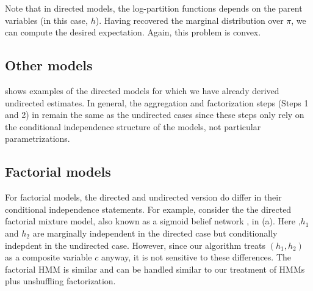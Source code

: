 Note that in directed models, the log-partition functions depends on the parent variables (in this case, $h$).
Having recovered the marginal distribution over $\pi$, we can compute the desired expectation.
Again, this problem is convex.



\subsection{Other models}

 shows examples of the directed models
for which we have already derived undirected estimates.
In general, the aggregation
and factorization steps (Steps 1 and 2) in 
remain the same as the undirected cases since these steps
only rely on the conditional independence structure of the models,
not particular parametrizations.

\subsection{Factorial models}

For factorial models, the directed and undirected version do differ in their
conditional independence statements.
For example, consider the 
the directed factorial mixture model,
also known as a sigmoid belief network \citep{saul96sigmoid},
in (a).
Here ,$h_1$ and $h_2$ are marginally independent in the directed
case but conditionally indepdent in the undirected case.
However, since our algorithm treats $(h_1,h_2)$ as a composite variable $c$
anyway, it is not sensitive to these differences.
The factorial HMM \cite{ghahramani97fhmm} is similar and can be handled
similar to our treatment of HMMs plus unshuffling factorization.
